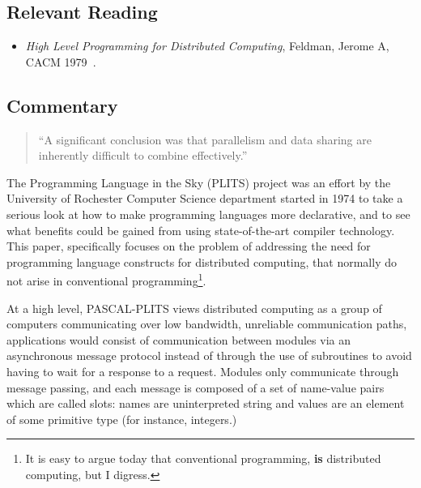 \subsection{Relevant Reading}

\begin{itemize}
	\item \textit{High Level Programming for Distributed Computing}, Feldman, Jerome A, CACM 1979~\cite{feldman1979high}.
\end{itemize}

\subsection{Commentary}

\begin{quote}
``A significant conclusion was that parallelism and data sharing are inherently difficult to combine effectively.''	
\end{quote}

The Programming Language in the Sky (PLITS) project was an effort by the University of Rochester Computer Science department started in 1974 to take a serious look at how to make programming languages more declarative, and to see what benefits could be gained from using state-of-the-art compiler technology.  This paper, specifically focuses on the problem of addressing the need for programming language constructs for distributed computing, that normally do not arise in conventional programming\footnote{It is easy to argue today that conventional programming, \textbf{is} distributed computing, but I digress.}.

At a high level, PASCAL-PLITS views distributed computing as a group of computers communicating over low bandwidth, unreliable communication paths, applications would consist of communication between modules via an asynchronous message protocol instead of through the use of subroutines to avoid having to wait for a response to a request.  Modules only communicate through message passing, and each message is composed of a set of name-value pairs which are called slots: names are uninterpreted string and values are an element of some primitive type (for instance, integers.)

